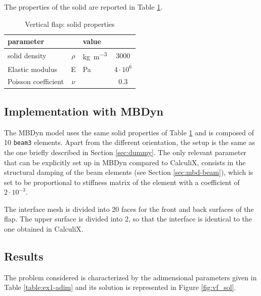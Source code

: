 The properties of the solid are reported in Table \ref{table:ex1-solid}.

\begin{table}[!htb]
	\begin{center}
		\begin{tabular}{ l c  l | c } 
			parameter & & value &    \\ 
			\hline
			solid density  & $\rho$ & \si{kg.m^{-3}} & 3000    \\
			Elastic modulus  & E & \si{Pa} & $4\cdot 10^6$    \\
			Poisson coefficient & $\nu$ & & $0.3$  \\
		\end{tabular}
	\end{center}
	\caption{Vertical flap: solid properties}
	\label{table:ex1-solid}
\end{table}

 
\subsection{Implementation with MBDyn}


The MBDyn model uses the same solid properties of Table \ref{table:ex1-solid} and is composed of 10 \texttt{beam3} elements. Apart from the different orientation, the setup is the same as the one briefly described in Section \ref{sec:dummy}. The only relevant parameter that can be explicitly set up in MBDyn compared to CalculiX, consists in the structural damping of the beam elements (see Section \ref{sec:mbd-beam}), which is set to be proportional to stiffness matrix of the element with a coefficient of $2\cdot10^{-3}$.

The interface mesh is divided into 20 faces for the front and back surfaces of the flap. The upper surface is divided into 2, so that the interface is identical to the one obtained in CalculiX. 



\subsection{Results}

The problem considered is characterized by the adimensional parameters given in Table \ref{table:ex1-adim} and its solution is represented in Figure \ref{fig:vf_sol}.


